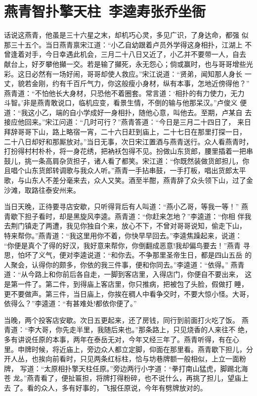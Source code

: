 \chapter{燕青智扑擎天柱~李逵寿张乔坐衙}

话说这燕青，他虽是三十六星之末，却机巧心灵，多见广识，了身达命，都强
似那三十五个。当日燕青禀宋江道：“小乙自幼跟着卢员外学得这身相扑，江湖上
不曾逢着对手，今日幸遇此机会，三月二十八日又近了，小乙并不要带一人，自去
献台上，好歹攀他攧一交。若是输了攧死，永无怨心；倘或赢时，也与哥哥增些光
彩。这日必然有一场好闹，哥哥却使人救应。”宋江说道：“贤弟，闻知那人身长
一丈，貌若金刚，约有千百斤气力，你这般瘦小身材，纵有本事，怎地近傍得他？”
燕青道：“不怕他长大身材，只恐他不着圈套。常言道：‘相扑的有力使力，无力
斗智。’非是燕青敢说口，临机应变，看景生情，不倒的输与他那呆汉。”卢俊义
便道：“我这小乙，端的自小学成好一身相扑，随他心意，叫他去。至期，卢某自
去接应他回来。”宋江问道：“几时可行？”燕青答道：“今日是三月二十四日了，
来日拜辞哥哥下山，路上略宿一宵，二十六日赶到庙上，二十七日在那里打探一日，
二十八日却好和那厮放对。”当日无事，次日宋江置酒与燕青送行。众人看燕青时，
打扮得村村朴朴，将一身花绣，把衲袄包得不见。扮做山东货郎，腰里插着一把串
鼓儿，挑一条高肩杂货担子，诸人看了都笑。宋江道：“你既然装做货郎担儿，你
且唱个山东货郎转调歌与我众人听。”燕青一手拈串鼓，一手打板，唱出货郎太平
歌，与山东人不差分毫来去，众人又笑。酒至半酣，燕青辞了众头领下山，过了金
沙滩，取路往泰安州来。

当日天晚，正待要寻店安歇，只听得背后有人叫道：“燕小乙哥，等我一等！”
燕青歇下担子看时，却是黑旋风李逵。燕青道：“你赶来怎地？”李逵道：“你相
伴我去荆门镇走了两遭，我见你独自个来，放心不下，不曾对哥哥说知，偷走下山，
特来帮你。”燕青道：“我这里用你不着，你快早早回去。”李逵焦躁起来，说道：
“你便是真个了得的好汉，我好意来帮你，你倒翻成恶意!我却偏鸟要去！”燕青
寻思，怕坏了义气，便对李逵说道：“和你去。不争那里圣帝生日，都是四山五岳
的人聚会，认得你的颇多，你依的我三件事，便和你同去。”李逵道：“依得。”
燕青道：“从今路上和你前后各自走，一脚到客店里，入得店门，你便自不要出来，
这是第一件了。第二件，到得庙上客店里，你只推病，把被包了头脸，假做打睡，
更不要做声。第三件，当日庙上，你挨在稠人中看争交时，不要大惊小怪。大哥，
依得么？”李逵道：“有甚难处!都依你便了。”

当晚，两个投客店安歇。次日五更起来，还了房钱，同行到前面打火吃了饭。
燕青道：“李大哥，你先走半里，我随后来也。”那条路上，只见烧香的人来往不
绝，多有讲说任原的本事，两年在泰岳无对，今年又经三年了。燕青听得，有在心
里。申牌时候，将近庙上，旁边众人都立定脚，仰面在那里看。燕青歇下担儿，分
开人丛，也挨向前看时，只见两条红标柱，恰与坊巷牌额一般相似，上立一面粉牌，
写道：“太原相扑擎天柱任原。”旁边两行小字道：“拳打南山猛虎，脚踢北海苍
龙。”燕青看了，便扯匾担，将牌打得粉碎，也不说什么，再挑了担儿，望庙上去
了。看的众人，多有好事的，飞报任原说，今年有劈牌放对的。

